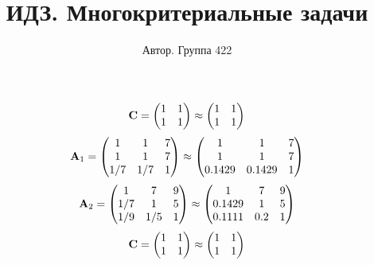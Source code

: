 \documentclass[10pt,a4paper]{article}
\title{ИДЗ. Многокритериальные задачи}
\author{Автор. Группа 422}
\begin{document}
	\maketitle
	
	\[
		\bold{C} = 
		\begin{pmatrix}
			{1}{} & {1}{} \\
			{1}{} & {1}{} \\
		\end{pmatrix}
		\approx
		\begin{pmatrix}
			1        & 1        \\
			1        & 1        \\
		\end{pmatrix}
	\]
	\[
		\bold{A}_{1} = 
		\begin{pmatrix}
			{1}{} & {1}{} & {{7}}{} \\
			{1}{} & {1}{} & {{7}}{} \\
			{1} / {{7}} & {1} / {{7}} & {1}{} \\
		\end{pmatrix}
		\approx
		\begin{pmatrix}
			1        & 1        & 7        \\
			1        & 1        & 7        \\
			0.1429   & 0.1429   & 1        \\
		\end{pmatrix}
	\]
	\[
		\bold{A}_{2} = 
		\begin{pmatrix}
			{1}{} & {{7}}{} & {{9}}{} \\
			{1} / {{7}} & {1}{} & {{5}}{} \\
			{1} / {{9}} & {1} / {{5}} & {1}{} \\
		\end{pmatrix}
		\approx
		\begin{pmatrix}
			1        & 7        & 9        \\
			0.1429   & 1        & 5        \\
			0.1111   & 0.2      & 1        \\
		\end{pmatrix}
	\]
	\[
		\bold{C} = 
		\begin{pmatrix}
			{1}{} & {1}{} \\
			{1}{} & {1}{} \\
		\end{pmatrix}
		\approx
		\begin{pmatrix}
			1        & 1        \\
			1        & 1        \\
		\end{pmatrix}
	\]
\end{document}

